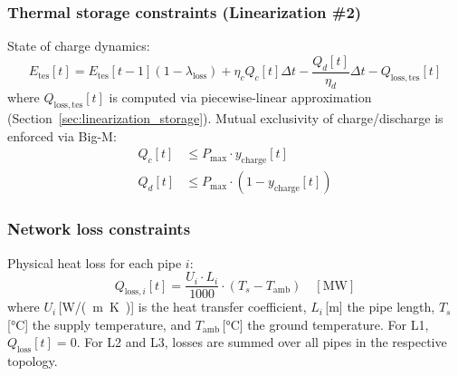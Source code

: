 \documentclass[a4paper,fleqn]{cas-dc}
\begin{document}
\subsubsection{Thermal storage constraints (Linearization \#2)}

State of charge dynamics:
\begin{equation}
E_\mathrm{tes}[t] = E_\mathrm{tes}[t{-}1](1 - \lambda_\mathrm{loss}) + \eta_c Q_c[t] \Delta t - \frac{Q_d[t]}{\eta_d} \Delta t - Q_\mathrm{loss,tes}[t]
\label{eq:storage_soc}
\end{equation}
where $Q_\mathrm{loss,tes}[t]$ is computed via piecewise-linear approximation (Section~\ref{sec:linearization_storage}). Mutual exclusivity of charge/discharge is enforced via Big-M:
\begin{align}
Q_c[t] &\leq P_\mathrm{max} \cdot y_\mathrm{charge}[t] \label{eq:stor_charge} \\
Q_d[t] &\leq P_\mathrm{max} \cdot (1 - y_\mathrm{charge}[t]) \label{eq:stor_discharge}
\end{align}

\subsubsection{Network loss constraints}

Physical heat loss for each pipe $i$:
\begin{equation}
Q_{\mathrm{loss},i}[t] = \frac{U_i \cdot L_i}{1000} \cdot (T_s - T_\mathrm{amb}) \quad [\mathrm{MW}]
\label{eq:pipe_loss}
\end{equation}
where $U_i$\,[\si{W/(m.K)}] is the heat transfer coefficient, $L_i$\,[m] the pipe length, $T_s$\,[\si{\degreeCelsius}] the supply temperature, and $T_\mathrm{amb}$\,[\si{\degreeCelsius}] the ground temperature. For L1, $Q_\mathrm{loss}[t] = 0$. For L2 and L3, losses are summed over all pipes in the respective topology.
\end{document}
